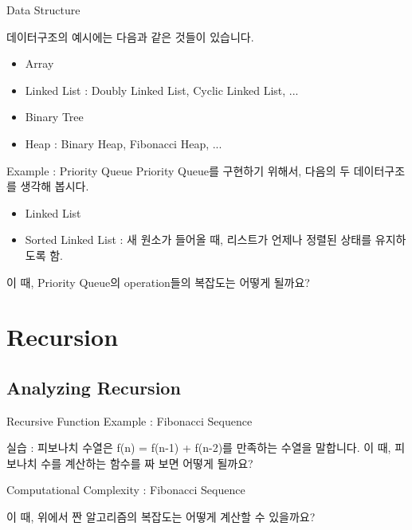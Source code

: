 \documentclass{beamer}
\begin{document}
\begin{frame}{Data Structure}

데이터구조의 예시에는 다음과 같은 것들이 있습니다. 

\begin{itemize} 
\item Array 
\item Linked List : Doubly Linked List, Cyclic Linked List, ...
\item Binary Tree 
\item Heap : Binary Heap, Fibonacci Heap, ... 
\end{itemize}

\end{frame}

\begin{frame}{Example : Priority Queue}
Priority Queue를 구현하기 위해서, 다음의 두 데이터구조를 생각해 봅시다. 

\begin{itemize} 
\item Linked List 
\item Sorted Linked List : 새 원소가 들어올 때, 리스트가 언제나 정렬된 상태를 유지하도록 함. 
\end{itemize}

이 때, Priority Queue의 operation들의 복잡도는 어떻게 될까요?
\end{frame}

\section{Recursion} 

\subsection{Analyzing Recursion} 

\begin{frame}{Recursive Function Example : Fibonacci Sequence}

실습 : 피보나치 수열은 f(n) = f(n-1) + f(n-2)를 만족하는 수열을 말합니다. 이 때, 피보나치 수를 계산하는 함수를 짜 보면 어떻게 될까요? 
\end{frame}


\begin{frame}{Computational Complexity : Fibonacci Sequence}

이 때, 위에서 짠 알고리즘의 복잡도는 어떻게 계산할 수 있을까요? 

\end{frame}
\end{document}
